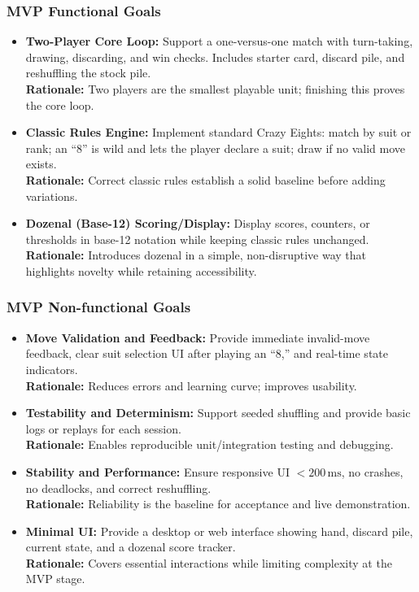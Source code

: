 \documentclass[12pt]{article}
\begin{document}
\subsubsection{MVP Functional Goals}
\begin{itemize}
    \item \textbf{Two-Player Core Loop:} Support a one-versus-one match with turn-taking, drawing, discarding, and win checks. Includes starter card, discard pile, and reshuffling the stock pile. \\
    \textbf{Rationale:} Two players are the smallest playable unit; finishing this proves the core loop.
    \item \textbf{Classic Rules Engine:} Implement standard Crazy Eights: match by suit or rank; an ``8'' is wild and lets the player declare a suit; draw if no valid move exists. \\
    \textbf{Rationale:} Correct classic rules establish a solid baseline before adding variations.
    \item \textbf{Dozenal (Base-12) Scoring/Display:} Display scores, counters, or thresholds in base-12 notation while keeping classic rules unchanged. \\
    \textbf{Rationale:} Introduces dozenal in a simple, non-disruptive way that highlights novelty while retaining accessibility.
\end{itemize}

\subsubsection{MVP Non-functional Goals}
\begin{itemize}
    \item \textbf{Move Validation and Feedback:} Provide immediate invalid-move feedback, clear suit selection UI after playing an ``8,'' and real-time state indicators. \\
    \textbf{Rationale:} Reduces errors and learning curve; improves usability.
    \item \textbf{Testability and Determinism:} Support seeded shuffling and provide basic logs or replays for each session. \\
    \textbf{Rationale:} Enables reproducible unit/integration testing and debugging.
    \item \textbf{Stability and Performance:} Ensure responsive UI $<200\,\text{ms}$, no crashes, no deadlocks, and correct reshuffling. \\
    \textbf{Rationale:} Reliability is the baseline for acceptance and live demonstration.
    \item \textbf{Minimal UI:} Provide a desktop or web interface showing hand, discard pile, current state, and a dozenal score tracker. \\
    \textbf{Rationale:} Covers essential interactions while limiting complexity at the MVP stage.
\end{itemize}
\end{document}
